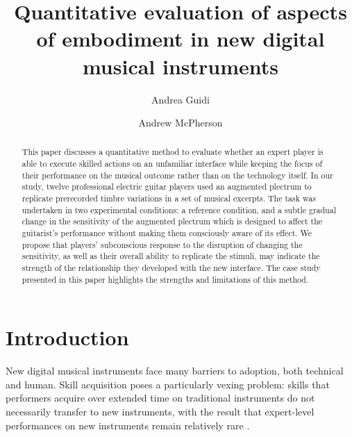 \documentclass[sigconf]{nimeart}
\begin{document}
\title[Quantitative evaluation of aspects of embodiment in new digital…]{Quantitative evaluation of aspects of embodiment in new digital musical instruments}
\author{Andrea Guidi}
\author{Andrew McPherson}
\renewcommand{\shortauthors}{Guidi and McPherson}
\begin{abstract}
This paper discusses a quantitative method to evaluate whether an expert player is able to execute skilled actions on an unfamiliar interface while keeping the focus of their performance on the musical outcome rather than on the technology itself. In our study, twelve professional electric guitar players used an augmented plectrum to replicate prerecorded timbre variations in a set of musical excerpts. The task was undertaken in two experimental conditions: a reference condition, and a subtle gradual change in the sensitivity of the augmented plectrum which is designed to affect the guitarist's performance without making them consciously aware of its effect. We propose that players' subconscious response to the disruption of changing the sensitivity, as well as their overall ability to replicate the stimuli, may indicate the strength of the relationship they developed with the new interface. The case study presented in this paper highlights the strengths and limitations of this method.
\end{abstract}


\maketitle
\section{Introduction}\label{introduction}

New digital musical instruments face many barriers to adoption, both technical and human. Skill acquisition poses a particularly vexing problem: skills that performers acquire over extended time on traditional instruments do not necessarily transfer to new instruments, with the result that expert-level performances on new instruments remain relatively rare \cite{morreale2017design,morreale2018nime,levitin2002control}.
\end{document}
